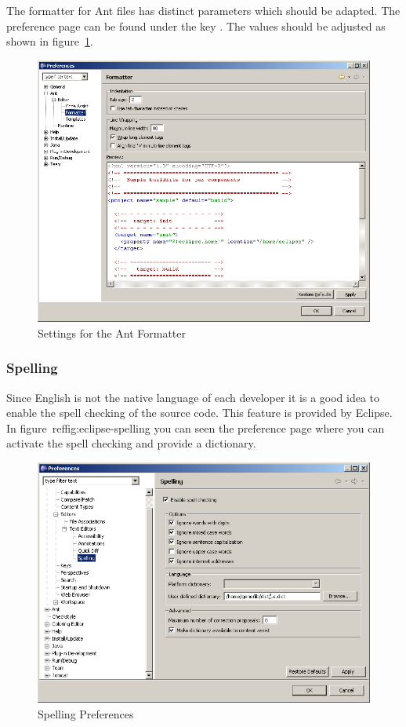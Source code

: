 The formatter for Ant files has distinct parameters which should be
adapted. The preference page can be found under the key . The values should be adjusted as shown in
figure~\ref{fig:eclipse-ant-formatter}.
\begin{figure}[htp]
  \centering  \includegraphics[scale=.4]{image/eclipse/ant-formatter}
  \caption{Settings for the Ant Formatter}\label{fig:eclipse-ant-formatter}
\end{figure}


\subsubsection{Spelling}

Since English is not the native language of each developer it is a
good idea to enable the spell checking of the source code. This
feature is provided by Eclipse. In figure~ref{fig:eclipse-spelling}
you can seen the preference page where you can activate the spell
checking and provide a dictionary.
\begin{figure}[htp]
  \centering
  \includegraphics[scale=.4]{image/spelling}
  \caption{Spelling Preferences}\label{fig:eclipse-spelling}
\end{figure}

